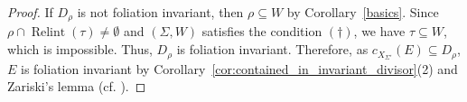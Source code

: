 \documentclass[12pt,reqno]{amsart}
\theoremstyle{definition}
\newcommand{\on}{\operatorname}
\begin{document}
\begin{proof}
    If $D_\rho$ is not foliation invariant, then $\rho\subseteq W$ by Corollary~\ref{basics}. 
    Since $\rho\cap\on{Relint}(\tau)\neq\emptyset$ and $(\Sigma,W)$ satisfies the condition $(\dagger)$, we have $\tau\subseteq W$, which is impossible. 
    Thus, $D_\rho$ is foliation invariant. 
    Therefore, as $c_{X_{\Sigma'}}(E)\subseteq D_\rho$, $E$ is foliation invariant by Corollary~\ref{cor:contained_in_invariant_divisor}(2) and Zariski's lemma (cf. \cite[Lemma 2.45]{KM98}). 
\end{proof}





% 

% 
% 
% 
% 

\end{document}
